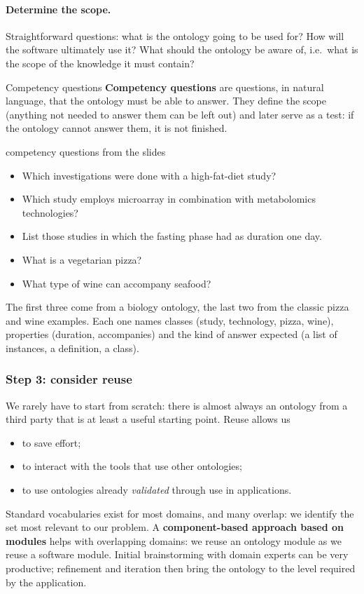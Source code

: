 \paragraph{Determine the scope.}
Straightforward questions: what is the ontology going to be used for? How will the
software ultimately use it? What should the ontology be aware of, i.e.\ what is the
scope of the knowledge it must contain?

\begin{nbdef}{Competency questions}
\textbf{Competency questions} are questions, in natural language, that the ontology
must be able to answer. They define the scope (anything not needed to answer them can be
left out) and later serve as a test: if the ontology cannot answer them, it is not
finished.
\end{nbdef}

\begin{nbexample}{competency questions from the slides}
\begin{itemize}[nosep]
  \item Which investigations were done with a high-fat-diet study?
  \item Which study employs microarray in combination with metabolomics technologies?
  \item List those studies in which the fasting phase had as duration one day.
  \item What is a vegetarian pizza?
  \item What type of wine can accompany seafood?
\end{itemize}
The first three come from a biology ontology, the last two from the classic pizza and
wine examples. Each one names classes (study, technology, pizza, wine), properties
(duration, accompanies) and the kind of answer expected (a list of instances, a
definition, a class).
\end{nbexample}

\subsubsection{Step 3: consider reuse}

We rarely have to start from scratch: there is almost always an ontology from a third
party that is at least a useful starting point. Reuse allows us
\begin{itemize}[nosep]
  \item to save effort;
  \item to interact with the tools that use other ontologies;
  \item to use ontologies already \emph{validated} through use in applications.
\end{itemize}
Standard vocabularies exist for most domains, and many overlap: we identify the set most
relevant to our problem. A \textbf{component-based approach based on modules} helps with
overlapping domains: we reuse an ontology module as we reuse a software module. Initial
brainstorming with domain experts can be very productive; refinement and iteration then
bring the ontology to the level required by the application.

